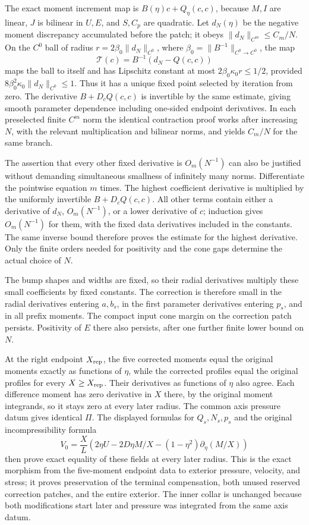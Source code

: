 \documentclass[10pt,a4paper]{article}
\begin{document}
The exact moment increment map is \(B(\eta)c+Q_\eta(c,c)\), because \(M,I\) are linear, \(J\) is bilinear in \(U,E\), and \(S,C_p\) are quadratic. Let \(d_N(\eta)\) be the negative moment discrepancy accumulated before the patch; it obeys \(\|d_N\|_{C^m}\le C_m/N\). On the \(C^0\) ball of radius \(r=2\beta_0\|d_N\|_{C^0}\), where \(\beta_0=\|B^{-1}\|_{C^0\to C^0}\), the map \[
\mathcal T(c)=B^{-1}(d_N-Q(c,c))
\] maps the ball to itself and has Lipschitz constant at most \(2\beta_0\kappa_0r\le1/2\), provided \(8\beta_0^2\kappa_0\|d_N\|_{C^0}\le1\). Thus it has a unique fixed point selected by iteration from zero. The derivative \(B+D_cQ(c,c)\) is invertible by the same estimate, giving smooth parameter dependence including one-sided endpoint derivatives. In each preselected finite \(C^m\) norm the identical contraction proof works after increasing \(N\), with the relevant multiplication and bilinear norms, and yields \(C_m/N\) for the same branch.

The assertion that every other fixed derivative is \(O_m(N^{-1})\) can also be justified without demanding simultaneous smallness of infinitely many norms. Differentiate the pointwise equation \(m\) times. The highest coefficient derivative is multiplied by the uniformly invertible \(B+D_cQ(c,c)\). All other terms contain either a derivative of \(d_N\), \(O_m(N^{-1})\), or a lower derivative of \(c\); induction gives \(O_m(N^{-1})\) for them, with the fixed data derivatives included in the constants. The same inverse bound therefore proves the estimate for the highest derivative. Only the finite orders needed for positivity and the cone gaps determine the actual choice of \(N\).

The bump shapes and widths are fixed, so their radial derivatives multiply these small coefficients by fixed constants. The correction is therefore small in the radial derivatives entering \(a,b_s\), in the first parameter derivatives entering \(p_s\), and in all prefix moments. The compact input cone margin on the correction patch persists. Positivity of \(E\) there also persists, after one further finite lower bound on \(N\).

At the right endpoint \(X_{\rm rep}\), the five corrected moments equal the original moments exactly as functions of \(\eta\), while the corrected profiles equal the original profiles for every \(X\ge X_{\rm rep}\). Their derivatives as functions of \(\eta\) also agree. Each difference moment has zero derivative in \(X\) there, by the original moment integrands, so it stays zero at every later radius. The common axis pressure datum gives identical \(\Pi\). The displayed formulas for \(Q_s,N_s,p_s\) and the original incompressibility formula \[
V_0=\frac X L\left(2\eta U-2D\eta M/X-(1-\eta^2)\partial_\eta(M/X)\right)
\] then prove exact equality of these fields at every later radius. This is the exact morphism from the five-moment endpoint data to exterior pressure, velocity, and stress; it proves preservation of the terminal compensation, both unused reserved correction patches, and the entire exterior. The inner collar is unchanged because both modifications start later and pressure was integrated from the same axis datum.
\end{document}

